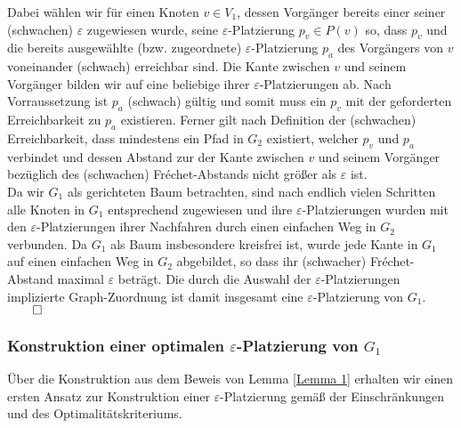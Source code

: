 \documentclass[a4paper, 12pt, twoside]{article}
\theoremstyle{Format1} %
\begin{document}
Dabei wählen wir für einen Knoten $v \in V_1$, dessen Vorgänger bereits einer seiner (schwachen) $\varepsilon$ zugewiesen wurde,
seine $\varepsilon$-Platzierung $p_v \in P(v)$ so, dass $p_v$
und die bereits ausgewählte (bzw. zugeordnete) $\varepsilon$-Platzierung $p_a$ des Vorgängers von $v$ voneinander (schwach) erreichbar sind.
Die Kante zwischen $v$ und seinem Vorgänger bilden wir auf eine beliebige ihrer $\varepsilon$-Platzierungen ab.
Nach Vorraussetzung ist $p_a$ (schwach) gültig und somit muss ein $p_v$ mit der geforderten Erreichbarkeit zu $p_a$ existieren.
Ferner gilt nach Definition der (schwachen) Erreichbarkeit, dass mindestens ein Pfad in $G_2$ existiert, welcher $p_v$ und $p_a$ verbindet
und dessen Abstand zur der Kante zwischen $v$ und seinem Vorgänger bezüglich des (schwachen) Fréchet-Abstands nicht größer als $\varepsilon$ ist.
\\
Da wir $G_1$ als gerichteten Baum betrachten, sind nach endlich vielen Schritten alle Knoten in $G_1$ entsprechend zugewiesen und ihre $\varepsilon$-Platzierungen
wurden mit den $\varepsilon$-Platzierungen ihrer Nachfahren durch einen einfachen Weg in $G_2$ verbunden.
Da $G_1$ als Baum insbesondere kreisfrei ist, wurde jede Kante in $G_1$ auf einen einfachen Weg in $G_2$ abgebildet,
so dass ihr (schwacher) Fréchet-Abstand maximal $\varepsilon$ beträgt.
Die durch die Auswahl der $\varepsilon$-Platzierungen implizierte Graph-Zuordnung ist damit insgesamt eine $\varepsilon$-Platzierung von $G_1$. $\qed$

\subsubsection{Konstruktion einer optimalen $\varepsilon$-Platzierung von $G_1$}
Über die Konstruktion aus dem Beweis von Lemma \ref{Lemma 1} erhalten wir einen ersten Ansatz zur Konstruktion einer $\varepsilon$-Platzierung gemäß der Einschränkungen und
des Optimalitätskriteriums.
\end{document}
